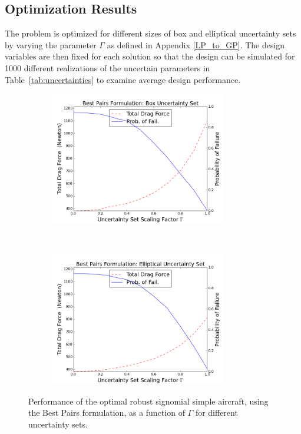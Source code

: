 \subsection{Optimization Results}

The problem is optimized for different sizes of box and elliptical uncertainty sets
by varying the parameter $\Gamma$ as defined in Appendix \ref{LP_to_GP}.
The design variables are then fixed for each solution so that the design can be simulated for
1000 different realizations of the uncertain parameters in Table~\ref{tab:uncertainties}
to examine average design performance.\\

\begin{figure}[ht]
    \centering
    \captionsetup{justification=centering, font=small}
    \begin{subfigure}{0.49\textwidth}
        \centering
        \includegraphics[height=2.3in]{signomial_simple_flight/box_best_pairs.png}
    \end{subfigure}%
    ~ 
    \begin{subfigure}{0.49\textwidth}
        \centering
        \includegraphics[height=2.3in]{signomial_simple_flight/ell_best_pairs.png}
    \end{subfigure}
    \caption{Performance of the optimal robust signomial simple aircraft, using the Best Pairs formulation, as a function of $\Gamma$ for different uncertainty sets.}
    \label{signomial_var_gamma}
\end{figure}

